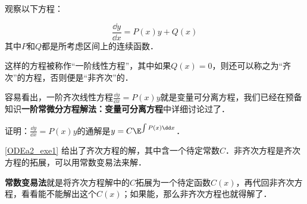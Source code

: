 

观察以下方程：

\begin{equation}\label{ODEa2_eq1}
\frac{\dd y}{\dd x}=P(x)y+Q(x)
\end{equation}
其中$P$和$Q$都是所考虑区间上的连续函数．

这样的方程被称作“一阶线性方程”，其中如果$Q(x)=0$，则还可以称之为“齐次”的方程，否则便是“非齐次”的．

容易看出，一阶齐次线性方程$\frac{\dd y}{\dd x}=P(x)y$就是变量可分离方程，我们已经在预备知识\textbf{一阶常微分方程解法：变量可分离方程}中详细讨论过了．

\begin{exercise}{}\label{ODEa2_exe1}
证明：$\frac{\dd y}{\dd x}=P(x)y$的通解是$y=C\E^{\int P(x)\dd x}$．
\end{exercise}

\autoref{ODEa2_exe1} 给出了齐次方程的解，其中含一个待定常数$C$．非齐次方程是齐次方程的拓展，可以用常数变易法来解．

\textbf{常数变易法}就是将齐次方程解中的$C$拓展为一个待定函数$C(x)$，再代回非齐次方程，看看能不能解出这个$C(x)$；如果能，那么非齐次方程也就得解了．

